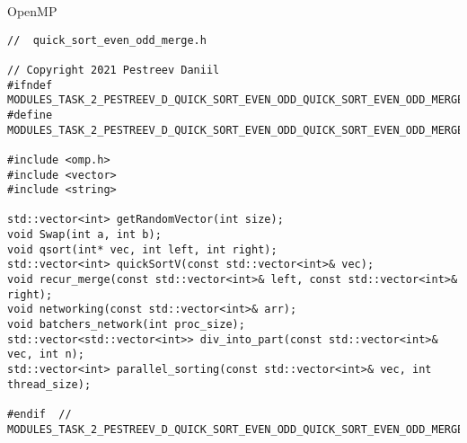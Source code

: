 \documentclass{report}
\begin{document}
\par OpenMP

\begin{lstlisting}
//  quick_sort_even_odd_merge.h

// Copyright 2021 Pestreev Daniil
#ifndef MODULES_TASK_2_PESTREEV_D_QUICK_SORT_EVEN_ODD_QUICK_SORT_EVEN_ODD_MERGE_H_
#define MODULES_TASK_2_PESTREEV_D_QUICK_SORT_EVEN_ODD_QUICK_SORT_EVEN_ODD_MERGE_H_

#include <omp.h>
#include <vector>
#include <string>

std::vector<int> getRandomVector(int size);
void Swap(int a, int b);
void qsort(int* vec, int left, int right);
std::vector<int> quickSortV(const std::vector<int>& vec);
void recur_merge(const std::vector<int>& left, const std::vector<int>& right);
void networking(const std::vector<int>& arr);
void batchers_network(int proc_size);
std::vector<std::vector<int>> div_into_part(const std::vector<int>& vec, int n);
std::vector<int> parallel_sorting(const std::vector<int>& vec, int thread_size);

#endif  // MODULES_TASK_2_PESTREEV_D_QUICK_SORT_EVEN_ODD_QUICK_SORT_EVEN_ODD_MERGE_H_
\end{lstlisting}
\end{document}
